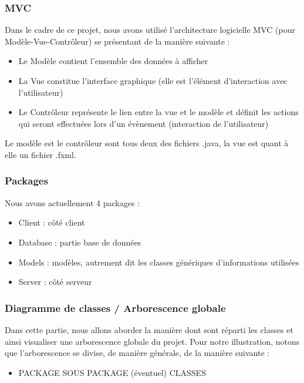 \documentclass[11pt]{article}
\begin{document}
\subsubsection{MVC}
    Dans le cadre de ce projet, nous avons utilisé l'architecture logicielle MVC (pour Modèle-Vue-Contrôleur) se présentant de la manière suivante :
\begin{itemize}
    \item Le Modèle contient l'ensemble des données à afficher
    \item La Vue constitue l'interface graphique (elle est l'élément d'interaction avec l'utilisateur)
    \item Le Contrôleur représente le lien entre la vue et le modèle et définit les actions qui seront effectuées lors d'un évènement (interaction de l'utilisateur)
\end{itemize}
    Le modèle est le contrôleur sont tous deux des fichiers .java, la vue est quant à elle un fichier .fxml.

\subsubsection{Packages}
    Nous avons actuellement 4 packages :

\begin{itemize}
    \item Client : côté client
    \item Database : partie base de données
    \item Models : modèles, autrement dit les classes génériques d’informations utilisées
    \item Server : côté serveur
\end{itemize}

\subsubsection{Diagramme de classes / Arborescence globale}
    Dans cette partie, nous allons aborder la manière dont sont réparti les classes et ainsi visualiser une arborescence globale du projet.
    Pour notre illustration, notons que l’arborescence se divise, de manière générale, de la manière suivante :

\begin{itemize}
    \item PACKAGE
        \subitem SOUS PACKAGE (éventuel)
            \subsubitem CLASSES
\end{itemize}
\end{document}
